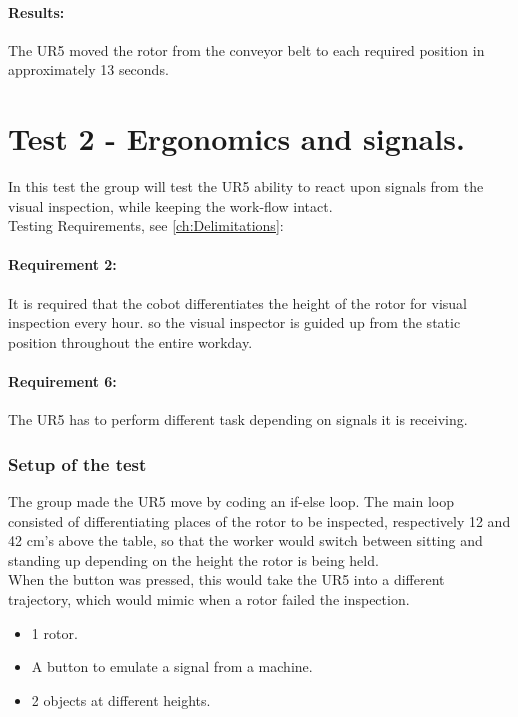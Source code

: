 \paragraph{Results:}
The UR5 moved the rotor from the conveyor belt to each required position in approximately 13 seconds. 

\section{Test 2 - Ergonomics and signals.}

In this test the group will test the UR5 ability to react upon signals from the visual inspection, while keeping the work-flow intact.\\
Testing Requirements, see \ref{ch:Delimitations}:

\paragraph{Requirement 2:} It is required that the cobot differentiates the height of the rotor for visual inspection every hour. so the visual inspector is guided up from the static position throughout the entire workday.
\paragraph{Requirement 6:} The UR5 has to perform different task depending on signals it is receiving.
\subsubsection{Setup of the test}

The group made the UR5 move by coding an if-else loop. The main loop consisted of differentiating places of the rotor to be inspected, respectively 12 and 42 cm's above the table, so that the worker would switch between sitting and standing up depending on the height the rotor is being held.\\
When the button was pressed, this would take the UR5 into a different trajectory, which would mimic when a rotor failed the inspection.

\begin{itemize}
    \item 1  rotor.
    \item A button to emulate a signal from a machine.
    \item 2 objects at different heights. 
\end{itemize}

